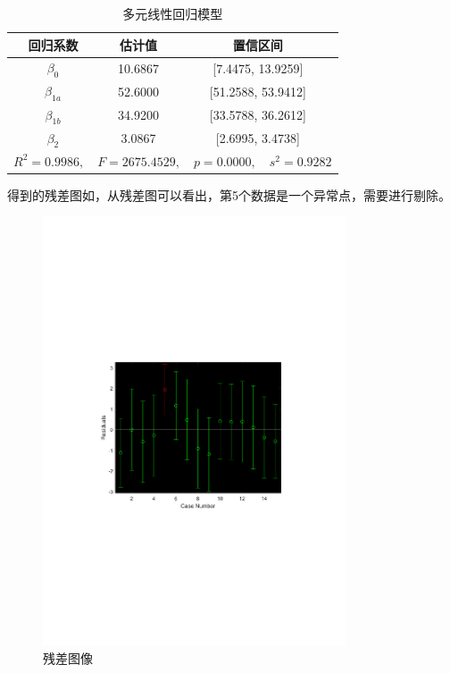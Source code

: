 \begin{table}[H]
    \centering
    \caption{多元线性回归模型}
    \label{tab:ex9_x1ab_linear}
    \begin{tabular}{|c|c|c|}
        \hline
        回归系数 & 估计值 & 置信区间\\
        \hline
        \hline
        \(\beta_0\) & 10.6867 & [7.4475, 13.9259]\\
        \hline
        \(\beta_{1a}\) & 52.6000 & [51.2588, 53.9412]\\
        \hline
        \(\beta_{1b}\) & 34.9200 & [33.5788, 36.2612]\\
        \hline
        \(\beta_2\) & 3.0867 & [2.6995, 3.4738]\\
        \hline
        \multicolumn{3}{|c|}{$R^2=0.9986, \quad F=2675.4529, \quad p=0.0000, \quad s^2=0.9282$}\\
        \hline
    \end{tabular}
\end{table}

得到的残差图如，从残差图可以看出，第5个数据是一个异常点，需要进行剔除。

\begin{figure}[H]
    \centering
    \includegraphics[width=0.8\textwidth,trim={3.09cm 9.295cm 3.09cm 9.295cm},clip]{fig/ex9_x1ab_rcoplot.pdf}
    \caption{残差图像}
    \label{fig:ex9_x1ab_rcoplot}
\end{figure}

